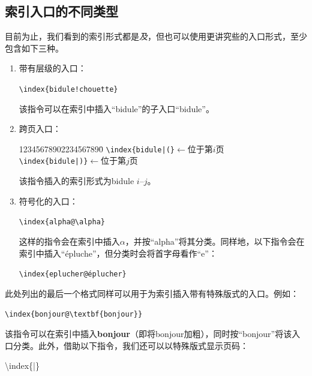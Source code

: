 \subsection{索引入口的不同类型}

目前为止，我们看到的索引形式都是\emph{及}，但也可以使用更讲究些的入口形式，至少包含如下三种。

\begin{enumerate}
    \item 带有层级的入口：
    
    \begin{dmd}
    \verb|\index{bidule!chouette}|
    \end{dmd}

    该指令可以在索引中插入``bidule''的子入口``bidule''。

    \item 跨页入口：
\begin{dmd}
\begin{tabbing}
12345678902234567890\=\kill
\verb+\index{bidule|(}+\>\textsf{$\leftarrow$位于第$i$页}\\
\verb+\index{bidule|)}+\>\textsf{$\leftarrow$位于第$j$页}
\end{tabbing}
\end{dmd}
    该指令插入的索引形式为bidule $i$--$j$。

    \item 符号化的入口：
    
    \begin{dmd}
    \verb|\index{alpha@\alpha}|
    \end{dmd}

    这样的指令会在索引中插入$\alpha$，并按``alpha''将其分类。同样地，以下指令会在索引中插入``épluche''，但分类时会将首字母看作``e''：

    \begin{dmd}
    \verb|\index{eplucher@éplucher}|
    \end{dmd}
\end{enumerate}

此处列出的最后一个格式同样可以用于为索引插入带有特殊版式的入口。例如：

\begin{dmd}
\verb|\index{bonjour@\textbf{bonjour}}|
\end{dmd}

该指令可以在索引中插入\textbf{bonjour}（即将bonjour加粗），同时按``bonjour''将该入口分类。此外，借助以下指令，我们还可以以特殊版式显示页码：

\begin{dmd}
\backslash index\{|\}
\end{dmd}

